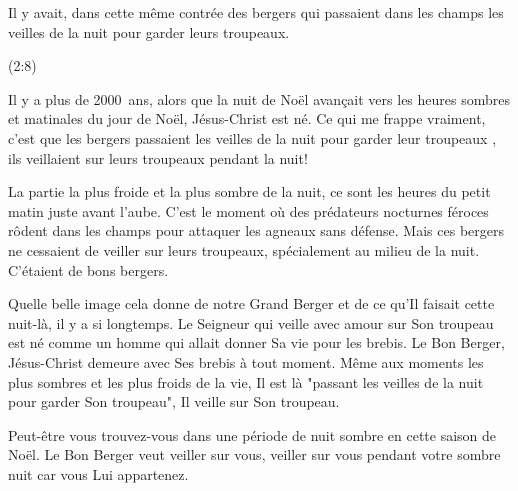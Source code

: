 
\epigraph{%
Il y avait, dans cette même contrée des bergers qui passaient dans les champs les veilles de la nuit pour garder leurs troupeaux.}{(2:8)}

Il y a plus de 2000~ans, alors que la nuit de Noël avançait vers les heures sombres et matinales du jour de Noël, Jésus-Christ est né. Ce qui me frappe vraiment, c'est que les bergers \og passaient les veilles de la nuit pour garder leur troupeaux \fg{}, ils veillaient sur leurs troupeaux pendant la nuit!

La partie la plus froide et la plus sombre de la nuit, ce sont les heures du petit matin juste avant l'aube. C'est le moment où des prédateurs nocturnes féroces rôdent dans les champs pour attaquer les agneaux sans défense. Mais ces bergers ne cessaient de veiller sur leurs troupeaux, spécialement au milieu de la nuit. C'étaient de bons bergers.

Quelle belle image cela donne de notre Grand Berger et de ce qu'Il faisait cette nuit-là, il y a si longtemps. Le Seigneur qui veille avec amour sur Son troupeau est né comme un homme qui allait donner Sa vie pour les brebis. Le Bon Berger, Jésus-Christ demeure avec Ses brebis à tout moment. Même aux moments les plus sombres et les plus froids de la vie, Il est là "passant les veilles de la nuit pour garder Son troupeau", Il veille sur Son troupeau.

Peut-être vous trouvez-vous dans une période de nuit sombre en cette saison de Noël. Le Bon Berger veut veiller sur vous, veiller sur vous pendant votre sombre nuit car vous Lui appartenez.


